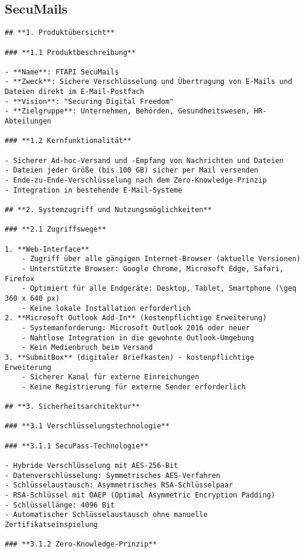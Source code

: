 \subsection{SecuMails}

\begin{verbatim}
## **1. Produktübersicht**

### **1.1 Produktbeschreibung**

- **Name**: FTAPI SecuMails
- **Zweck**: Sichere Verschlüsselung und Übertragung von E-Mails und Dateien direkt im E-Mail-Postfach
- **Vision**: "Securing Digital Freedom"
- **Zielgruppe**: Unternehmen, Behörden, Gesundheitswesen, HR-Abteilungen

### **1.2 Kernfunktionalität**

- Sicherer Ad-hoc-Versand und -Empfang von Nachrichten und Dateien
- Dateien jeder Größe (bis 100 GB) sicher per Mail versenden
- Ende-zu-Ende-Verschlüsselung nach dem Zero-Knowledge-Prinzip
- Integration in bestehende E-Mail-Systeme

## **2. Systemzugriff und Nutzungsmöglichkeiten**

### **2.1 Zugriffswege**

1. **Web-Interface**
    - Zugriff über alle gängigen Internet-Browser (aktuelle Versionen)
    - Unterstützte Browser: Google Chrome, Microsoft Edge, Safari, Firefox
    - Optimiert für alle Endgeräte: Desktop, Tablet, Smartphone (\geq 360 x 640 px)
    - Keine lokale Installation erforderlich
2. **Microsoft Outlook Add-In** (kostenpflichtige Erweiterung)
    - Systemanforderung: Microsoft Outlook 2016 oder neuer
    - Nahtlose Integration in die gewohnte Outlook-Umgebung
    - Kein Medienbruch beim Versand
3. **SubmitBox** (digitaler Briefkasten) - kostenpflichtige Erweiterung
    - Sicherer Kanal für externe Einreichungen
    - Keine Registrierung für externe Sender erforderlich

## **3. Sicherheitsarchitektur**

### **3.1 Verschlüsselungstechnologie**

### **3.1.1 SecuPass-Technologie**

- Hybride Verschlüsselung mit AES-256-Bit
- Datenverschlüsselung: Symmetrisches AES-Verfahren
- Schlüsselaustausch: Asymmetrisches RSA-Schlüsselpaar
- RSA-Schlüssel mit OAEP (Optimal Asymmetric Encryption Padding)
- Schlüssellänge: 4096 Bit
- Automatischer Schlüsselaustausch ohne manuelle Zertifikatseinspielung

### **3.1.2 Zero-Knowledge-Prinzip**


\end{verbatim}
